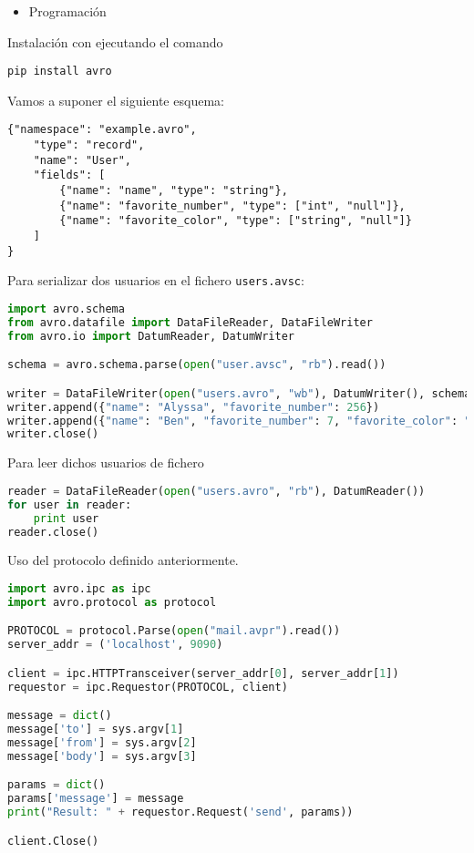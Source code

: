 \begin{itemize}[label=\color{red}\textbullet, leftmargin=*]
	\item \color{lightblue}Programación
\end{itemize}

Instalación con ejecutando el comando
\begin{lstlisting}
pip install avro
\end{lstlisting}
Vamos a suponer el siguiente esquema:
\begin{lstlisting}
{"namespace": "example.avro",
	"type": "record",
	"name": "User",
	"fields": [
		{"name": "name", "type": "string"},
		{"name": "favorite_number", "type": ["int", "null"]},
		{"name": "favorite_color", "type": ["string", "null"]}
	]
}
\end{lstlisting}

Para serializar dos usuarios en el fichero \texttt{users.avsc}:

\begin{lstlisting}[language=python]
import avro.schema
from avro.datafile import DataFileReader, DataFileWriter
from avro.io import DatumReader, DatumWriter

schema = avro.schema.parse(open("user.avsc", "rb").read())

writer = DataFileWriter(open("users.avro", "wb"), DatumWriter(), schema)
writer.append({"name": "Alyssa", "favorite_number": 256})
writer.append({"name": "Ben", "favorite_number": 7, "favorite_color": "red"})
writer.close()
\end{lstlisting}

Para leer dichos usuarios de fichero
\begin{lstlisting}[language=python]
reader = DataFileReader(open("users.avro", "rb"), DatumReader())
for user in reader:
	print user
reader.close()
\end{lstlisting}

Uso del protocolo definido anteriormente.
\begin{lstlisting}[language=python]
import avro.ipc as ipc
import avro.protocol as protocol

PROTOCOL = protocol.Parse(open("mail.avpr").read())
server_addr = ('localhost', 9090)

client = ipc.HTTPTransceiver(server_addr[0], server_addr[1])
requestor = ipc.Requestor(PROTOCOL, client)

message = dict()
message['to'] = sys.argv[1]
message['from'] = sys.argv[2]
message['body'] = sys.argv[3]

params = dict()
params['message'] = message
print("Result: " + requestor.Request('send', params))

client.Close()
\end{lstlisting}
